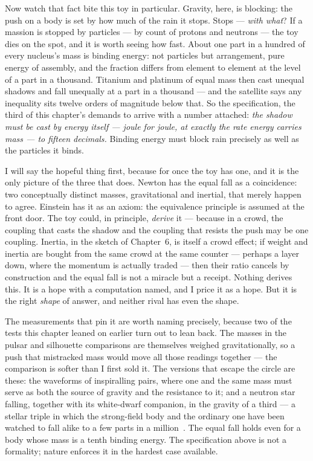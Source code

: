 \documentclass[fontsize=11pt,paper=a4,pagesize=auto,parskip=half-]{scrbook}
\newcommand{\Ixtmp}{}
\DeclareRobustCommand{\Ix}[1]{%
  #1%
  \begingroup
    \lowercase{\gdef\Ixtmp{#1}}%
    \expandafter\index\expandafter{\Ixtmp}%
  \endgroup}
\begin{document}
Now watch that fact bite this toy in particular. Gravity, here, is blocking: the push on a body is set by how much of the rain it stops. Stops --- \emph{with what}? If a massion is stopped by particles --- by count of protons and neutrons --- the toy dies on the spot, and it is worth seeing how fast. About one part in a hundred of every nucleus's mass is binding energy: not particles but arrangement, pure energy of assembly, and the fraction differs from element to element at the level of a part in a thousand. Titanium and platinum of equal mass then cast unequal shadows and fall unequally at a part in a thousand --- and the satellite says any inequality sits twelve orders of magnitude below that. So the specification, the third of this chapter's demands to arrive with a number attached: \emph{the shadow must be cast by energy itself --- joule for joule, at exactly the rate energy carries mass --- to fifteen decimals.} Binding energy must block rain precisely as well as the particles it binds.

I will say the hopeful thing first, because for once the toy has one, and it is the only picture of the three that does. Newton has the equal fall as a coincidence: two conceptually distinct masses, gravitational and inertial, that merely happen to agree. Einstein has it as an axiom: the \Ix{equivalence principle} is assumed at the front door. The toy could, in principle, \emph{derive} it --- because in a crowd, the coupling that casts the shadow and the coupling that resists the push may be one coupling. Inertia, in the sketch of Chapter~6, is itself a crowd effect; if weight and inertia are bought from the same crowd at the same counter --- perhaps a layer down, where the momentum is actually traded --- then their ratio cancels by construction and the equal fall is not a miracle but a receipt. Nothing derives this. It is a hope with a computation named, and I price it as a hope. But it is the right \emph{shape} of answer, and neither rival has even the shape.

The measurements that pin it are worth naming precisely, because two of the tests this chapter leaned on earlier turn out to lean back. The masses in the pulsar and silhouette comparisons are themselves weighed gravitationally, so a push that mistracked mass would move all those readings together --- the comparison is softer than I first sold it. The versions that escape the circle are these: the waveforms of inspiralling pairs, where one and the same mass must serve as both the source of gravity and the resistance to it; and a neutron star falling, together with its white-dwarf companion, in the gravity of a third --- a stellar triple in which the strong-field body and the ordinary one have been watched to fall alike to a few parts in a million~\cite{archibald2018}. The equal fall holds even for a body whose mass is a tenth binding energy. The specification above is not a formality; nature enforces it in the hardest case available.
\end{document}
